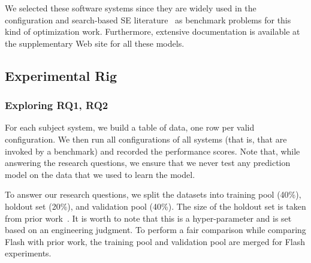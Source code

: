 \documentclass[10pt,journal,compsoc]{IEEEtran}
\newcommand{\flash}{{\sc Flash}\xspace}
\begin{document}
We selected these software systems since they are widely used in the configuration and search-based SE
literature~\cite{siegmund2012predicting, guo2013variability, sarkar2015cost, nair17, nair2017using, oh2017finding, jamshidi2016uncertainty, zuluaga2016varepsilon} as benchmark problems for this kind of optimization work. Furthermore, extensive documentation
is available at the supplementary Web site for all these models.

\subsection{Experimental Rig}
 
 \subsubsection{Exploring RQ1, RQ2}
 
For each subject system, we build a table of data, one row per valid configuration. We then run all configurations of all systems (that is, that are invoked by a benchmark) and recorded the performance scores. %
Note that, while answering the research questions, we ensure that we never test any prediction model on the data that we used to learn the model. 

To answer our research questions, we split the datasets into training pool (40\%), holdout set (20\%), and validation pool (40\%). The size of the holdout set is taken from prior work~\cite{nair2017using}. It is worth to note that this is a hyper-parameter and is set based on an engineering judgment. To perform a fair comparison while comparing \flash with prior work, the training pool and validation pool are merged for \flash experiments.
\end{document}
